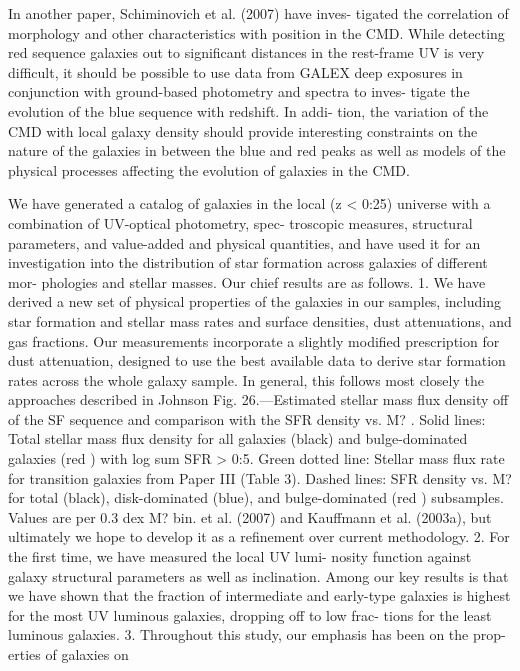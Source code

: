 In another paper, Schiminovich et al. (2007) have inves- tigated the
correlation of morphology and other characteristics with position in the CMD.
While detecting red sequence galaxies out to significant distances in the
rest-frame UV is very difficult, it should be possible to use data from GALEX
deep exposures in conjunction with ground-based photometry and spectra to inves-
tigate the evolution of the blue sequence with redshift. In addi- tion, the
variation of the CMD with local galaxy density should provide interesting
constraints on the nature of the galaxies in between the blue and red peaks as
well as models of the physical processes affecting the evolution of galaxies in
the CMD.


\cite{Schiminovich2007}
We have generated a catalog of galaxies in the local (z < 0:25) universe with a
combination of UV-optical photometry, spec- troscopic measures, structural
parameters, and value-added and physical quantities, and have used it for an
investigation into the distribution of star formation across galaxies of
different mor- phologies and stellar masses. Our chief results are as follows.
1. We have derived a new set of physical properties of the galaxies in our
samples, including star formation and stellar mass rates and surface densities,
dust attenuations, and gas fractions. Our measurements incorporate a slightly
modified prescription for dust attenuation, designed to use the best available
data to derive star formation rates across the whole galaxy sample. In general,
this follows most closely the approaches described in Johnson Fig. 26.—Estimated
stellar mass flux density off of the SF sequence and comparison with the SFR
density vs. M? . Solid lines: Total stellar mass flux density for all galaxies
(black) and bulge-dominated galaxies (red ) with log sum SFR > 0:5. Green dotted
line: Stellar mass flux rate for transition galaxies from Paper III (Table 3).
Dashed lines: SFR density vs. M? for total (black), disk-dominated (blue), and
bulge-dominated (red ) subsamples. Values are per 0.3 dex M? bin. et al. (2007)
and Kauffmann et al. (2003a), but ultimately we hope to develop it as a
refinement over current methodology. 2. For the first time, we have measured the
local UV lumi- nosity function against galaxy structural parameters as well as
inclination. Among our key results is that we have shown that the fraction of
intermediate and early-type galaxies is highest for the most UV luminous
galaxies, dropping off to low frac- tions for the least luminous galaxies. 3.
Throughout this study, our emphasis has been on the prop- erties of galaxies on

